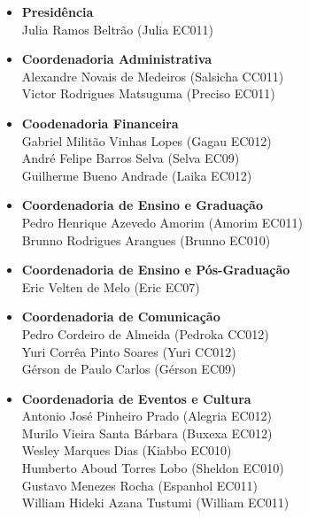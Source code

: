 \begin{itemize}
    \item   \textbf{Presidência}
        \\Julia Ramos Beltrão (Julia EC011)

    \item   \textbf{Coordenadoria Administrativa}
        \\Alexandre Novais de Medeiros (Salsicha CC011)
        \\Victor Rodrigues Matsuguma (Preciso EC011)

    \item   \textbf{Coodenadoria Financeira}
        \\Gabriel Militão Vinhas Lopes (Gagau EC012)
        \\André Felipe Barros Selva (Selva EC09)
        \\Guilherme Bueno Andrade (Laika EC012)

    \item   \textbf{Coordenadoria de Ensino e Graduação}
        \\Pedro Henrique Azevedo Amorim (Amorim EC011)
        \\Brunno Rodrigues Arangues (Brunno EC010)

    \item   \textbf{Coordenadoria de Ensino e Pós-Graduação}
        \\Eric Velten de Melo (Eric EC07)

    \item   \textbf{Coordenadoria de Comunicação}
        \\Pedro Cordeiro de Almeida (Pedroka CC012)
        \\Yuri Corrêa Pinto Soares (Yuri CC012)
        \\Gérson de Paulo Carlos (Gérson EC09)

    \item   \textbf{Coordenadoria de Eventos e Cultura}
        \\Antonio José Pinheiro Prado (Alegria EC012)
        \\Murilo Vieira Santa Bárbara (Buxexa EC012)
        \\Wesley Marques Dias (Kiabbo EC010)
        \\Humberto Aboud Torres Lobo (Sheldon EC010)
        \\Gustavo Menezes Rocha (Espanhol EC011)
        \\William Hideki Azana Tustumi (William EC011)


\end{itemize}

